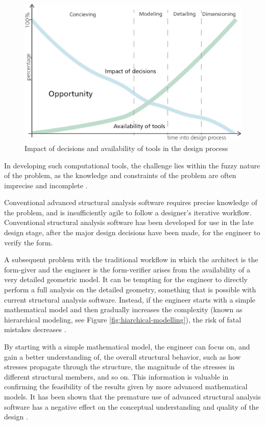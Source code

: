 \begin{figure}
  \includegraphics[width=350pt]{graphics/impact-tools.eps}
  \caption{Impact of decisions and availability of tools in the design process \cite{Hsu2000}}
  \label{fig:impact-tools}
\end{figure}


In developing such computational tools, the challenge lies within the fuzzy nature of the problem, as the knowledge and constraints of the problem are often imprecise and incomplete \cite{Hsu2000}.

Conventional advanced structural analysis software requires precise knowledge of the problem, and is insufficiently agile to follow a designer’s iterative workflow. Conventional structural analysis software has been developed for use in the late design stage, after the major design decisions have been made, for the engineer to verify the form. 

A subsequent problem with the traditional workflow in which the architect is the form-giver and the engineer is the form-verifier arises from the availability of a very detailed geometric model. It can be tempting for the engineer to directly perform a full analysis on the detailed geometry, something that is possible with current structural analysis software. Instead, if the engineer starts with a simple mathematical model and then gradually increases the complexity (known as hierarchical modeling, see Figure \ref{fig:hiarchical-modelling}), the risk of fatal mistakes decreases \cite{Bathe2006}. 

By starting with a simple mathematical model, the engineer can focus on, and gain a better understanding of, the overall structural behavior, such as how stresses propagate through the structure, the magnitude of the stresses in different structural members, and so on. This information is valuable in confirming the feasibility of the results given by more advanced mathematical models. It has been shown that the premature use of advanced structural analysis software has a negative effect on the conceptual understanding and quality of the design \cite{Froderberg2014}.

